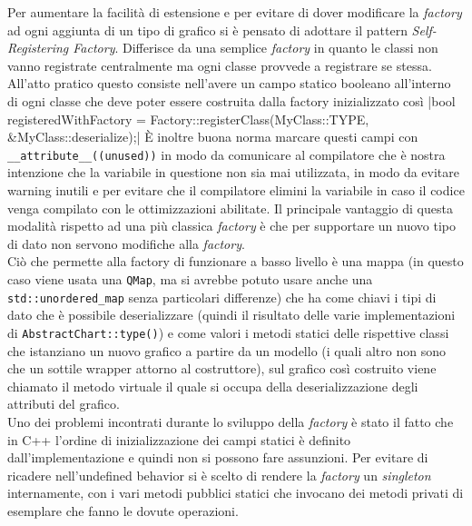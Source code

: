 Per aumentare la facilità di estensione e per evitare di dover modificare la \textit{factory} ad ogni aggiunta di un
tipo di grafico si è pensato di adottare il pattern \textit{Self-Registering Factory}.
Differisce da una semplice \textit{factory} in quanto le classi non vanno registrate centralmente ma ogni classe
provvede a registrare se stessa.
All'atto pratico questo consiste nell'avere un campo statico booleano all'interno di ogni classe che deve poter essere
costruita dalla factory inizializzato così
|bool registeredWithFactory = Factory::registerClass(MyClass::TYPE, &MyClass::deserialize);|
È inoltre buona norma marcare questi campi con \texttt{\_\_attribute\_\_((unused))} in modo da comunicare al compilatore
che è nostra intenzione che la variabile in questione non sia mai utilizzata, in modo da evitare warning inutili e
per evitare che il compilatore elimini la variabile in caso il codice venga compilato con le ottimizzazioni abilitate.
Il principale vantaggio di questa modalità rispetto ad una più classica \textit{factory} è che per supportare un nuovo
tipo di dato non servono modifiche alla \textit{factory}.\\
Ciò che permette alla factory di funzionare a basso livello è una mappa (in questo caso viene usata una \texttt{QMap},
ma si avrebbe potuto usare anche una \texttt{std::unordered\_map} senza particolari differenze) che ha come chiavi
i tipi di dato che è possibile deserializzare (quindi il risultato delle varie implementazioni di
\texttt{AbstractChart::type()}) e come valori i metodi statici delle rispettive classi che istanziano un nuovo grafico a
partire da un modello (i quali altro non sono che un sottile wrapper attorno al costruttore), sul grafico così costruito
viene chiamato il metodo virtuale
il quale si occupa della deserializzazione degli attributi del grafico.\\
Uno dei problemi incontrati durante lo sviluppo della \textit{factory} è stato il fatto che in C++ l'ordine di
inizializzazione dei campi statici è definito dall'implementazione e quindi non si possono fare assunzioni.
Per evitare di ricadere nell'undefined behavior si è scelto di rendere la \textit{factory} un \textit{singleton}
internamente, con i vari metodi pubblici statici che invocano dei metodi privati di esemplare che fanno le dovute
operazioni.

